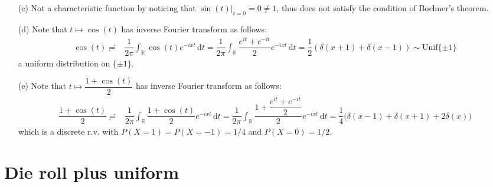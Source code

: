\documentclass[11pt,a4paper]{article}
\numberwithin{equation}{section}%
\begin{document}
\begin{itemize}[topsep=2pt,itemsep=0pt]
    
    \item[(c)] Not a characteristic function by noticing that $ \sin(t)\big|_{t=0}=0\neq 1 $, thus does not satisfy the condition of Bochner's theorem.
    \item[(d)] Note that $ t\mapsto \cos(t) $ has inverse Fourier transform as follows:
    \begin{align*}
        \cos(t)\risingdotseq & \dfrac{ 1 }{ 2\pi } \int _\mathbb{R} \cos(t)e^{-ixt}  \,\mathrm{d}t =\dfrac{ 1 }{ 2\pi } \int _\mathbb{R} \dfrac{ e^{it}+e^{-it} }{ 2 }e^{-ixt}  \,\mathrm{d}t =\dfrac{ 1 }{ 2 }(\delta (x+1)+\delta (x-1))
        \sim \mathrm{ Unif }\{\pm 1\} 
    \end{align*}
    a uniform distribution on $ \{\pm 1\} $.
    \item[(e)] Note that $ t\mapsto \dfrac{ 1+\cos(t) }{ 2 } $ has inverse Fourier transform as follows:
    \begin{align*}
        \dfrac{ 1+\cos(t) }{ 2 }\risingdotseq & \dfrac{ 1 }{ 2\pi } \int _\mathbb{R} \dfrac{ 1+\cos(t) }{ 2 }e^{-ixt}  \,\mathrm{d}t= \dfrac{ 1 }{ 2\pi } \int _\mathbb{R} \dfrac{ 1+\dfrac{ e^{it}+e^{-it} }{ 2 } }{ 2 }e^{-ixt}  \,\mathrm{d}t= \dfrac{ 1 }{ 4 }\big( \delta (x-1)+\delta (x+1) + 2\delta (x) \big)
    \end{align*}
    which is a discrete r.v. with $ P(X=1)=P(X=-1)=1/4 $ and $ P(X=0)=1/2 $.
\end{itemize}

    

\section{Die roll plus uniform}\label{sec:die_roll_plus_uniform}
\end{document}
